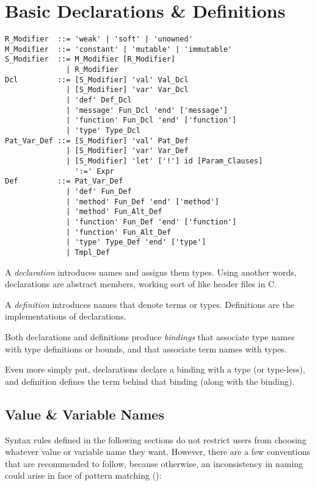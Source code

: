 
\chapter{Basic Declarations \& Definitions}

\syntax\begin{lstlisting}
R_Modifier  ::= 'weak' | 'soft' | 'unowned'
M_Modifier  ::= 'constant' | 'mutable' | 'immutable'
S_Modifier  ::= M_Modifier [R_Modifier]
              | R_Modifier
Dcl         ::= [S_Modifier] 'val' Val_Dcl
              | [S_Modifier] 'var' Var_Dcl
              | 'def' Def_Dcl
              | 'message' Fun_Dcl 'end' ['message']
              | 'function' Fun_Dcl 'end' ['function']
              | 'type' Type_Dcl
Pat_Var_Def ::= [S_Modifier] 'val' Pat_Def
              | [S_Modifier] 'var' Var_Def
              | [S_Modifier] 'let' ['!'] id [Param_Clauses] 
                ':=' Expr
Def         ::= Pat_Var_Def
              | 'def' Fun_Def
              | 'method' Fun_Def 'end' ['method']
              | 'method' Fun_Alt_Def
              | 'function' Fun_Def 'end' ['function']
              | 'function' Fun_Alt_Def
              | 'type' Type_Def 'end' ['type']
              | Tmpl_Def
\end{lstlisting}

A {\em declaration} introduces names and assigns them types. Using another words, declarations are abstract members, working sort of like header files in C. 

A {\em definition} introduces names that denote terms or types. Definitions are the implementations of declarations. 

Both declarations and definitions produce {\em bindings} that associate type names with type definitions or bounds, and that associate term names with types. 

Even more simply put, declarations declare a binding with a type (or type-less), and definition defines the term behind that binding (along with the binding). 





\section{Value \& Variable Names}
\label{sec:val-var-names}

Syntax rules defined in the following sections do not restrict users from choosing whatever value or variable name they want. However, there are a few conventions that are recommended to follow, because otherwise, an inconsistency in naming could arise in face of pattern matching ():

